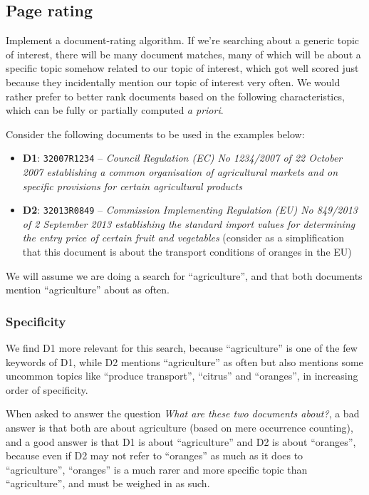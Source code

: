 \documentclass[sigconf, authorversion]{acmart}
\begin{document}
\subsection{Page rating}
Implement a document-rating algorithm. If we're searching about a generic topic of interest, there will be many document matches, many of which will be about a specific topic somehow related to our topic of interest, which got well scored just because they incidentally mention our topic of interest very often. We would rather prefer to better rank documents based on the following characteristics, which can be fully or partially computed \textit{a priori}.

Consider the following documents to be used in the examples below:
\begin{itemize}
    \item \textbf{D1}: \texttt{32007R1234} -- \textit{Council Regulation (EC) No 1234/2007 of 22 October 2007 establishing a common organisation of agricultural markets and on specific provisions for certain agricultural products}
    \item \textbf{D2}: \texttt{32013R0849} -- \textit{Commission Implementing Regulation (EU) No 849/2013 of 2 September 2013 establishing the standard import values for determining the entry price of certain fruit and vegetables} (consider as a simplification that this document is about the transport conditions of oranges in the EU)
\end{itemize}

We will assume we are doing a search for ``agriculture'', and that both documents mention ``agriculture'' about as often.

\subsubsection{Specificity}

We find D1 more relevant for this search, because ``agriculture'' is one of the few keywords of D1, while D2 mentions ``agriculture'' as often but also mentions some uncommon topics like ``produce transport'', ``citrus'' and ``oranges'', in increasing order of specificity.

When asked to answer the question \textit{What are these two documents about?}, a bad answer is that both are about agriculture (based on mere occurrence counting), and a good answer is that D1 is about ``agriculture'' and D2 is about ``oranges'', because even if D2 may not refer to ``oranges'' as much as it does to ``agriculture'', ``oranges'' is a much rarer and more specific topic than ``agriculture'', and must be weighed in as such.
\end{document}

